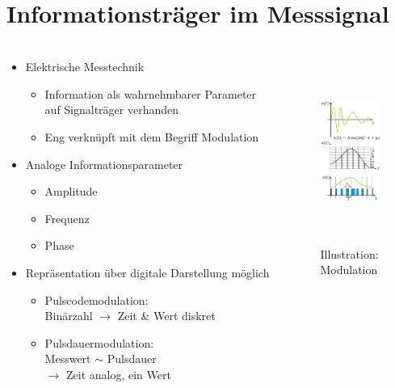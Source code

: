 \section{Informationsträger im Messsignal}
\begin{frame}
    \frametitle{\insertsection}
    \begin{columns}
        \begin{column}{0.6\textwidth}
            \begin{itemize}
                \item Elektrische Messtechnik
                \begin{itemize}
                    \item Information als wahrnehmbarer Parameter auf Signalträger verhanden
                    \item Eng verknüpft mit dem Begriff Modulation
                \end{itemize}
                \item Analoge Informationsparameter
                \begin{itemize}
                    \item Amplitude
                    \item Frequenz
                    \item Phase 
                \end{itemize}
                \item Repräsentation über digitale Darstellung möglich 
                \begin{itemize}
                    \item Pulscodemodulation: \\Binärzahl $\rightarrow$  Zeit \&  Wert diskret
                    \item Pulsdauermodulation: \\Messwert $\sim $ Pulsdauer \\ $\rightarrow $ Zeit analog, ein Wert
                \end{itemize}
            \end{itemize}
            
        \end{column}
        \begin{column}{0.4\textwidth}
            \begin{figure}
                \includegraphics[height = 6cm, width=0.9\columnwidth]{fig/slides_messtechnik1_ws21_28.PNG}
                \caption{Illustration: Modulation}
            \end{figure} 
            

\end{column}
\end{columns}
\end{frame}

